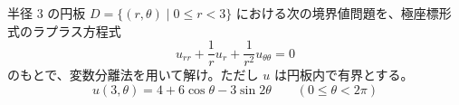 
半径 $3$ の円板 $D = \{(r,\theta) \mid 0 \le r < 3\}$ における次の境界値問題を、極座標形式のラプラス方程式
\[
u_{rr} + \frac{1}{r}u_r + \frac{1}{r^2}u_{\theta\theta} = 0
\]
のもとで、変数分離法を用いて解け。ただし $u$ は円板内で有界とする。
\[
u(3, \theta) = 4 + 6\cos\theta - 3\sin 2\theta \qquad (0 \le \theta < 2\pi)
\]
